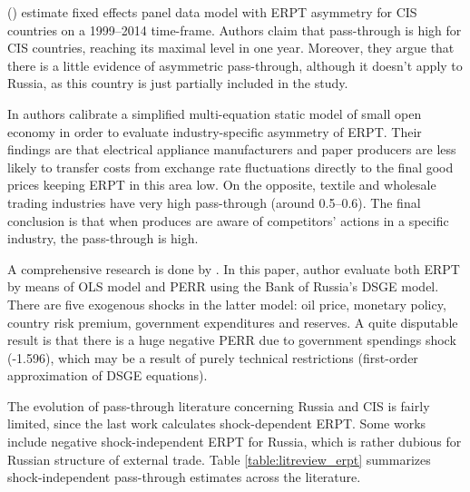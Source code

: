 \documentclass[12pt, a4paper]{extarticle}
\begin{document}
(\textcite{Comunale2018}) estimate fixed effects panel data model with ERPT asymmetry for CIS countries on a 1999--2014 time-frame. Authors claim that pass-through is high for CIS countries, reaching its maximal level in one year. Moreover, they argue that there is a little evidence of asymmetric pass-through, although it doesn't apply to Russia, as this country is just partially included in the study.

In \cite{Sinyakov2019} authors calibrate a simplified multi-equation static model of small open economy in order to evaluate industry-specific asymmetry of ERPT. Their findings are that electrical appliance manufacturers and paper producers are less likely to transfer costs from exchange rate fluctuations directly to the final good prices keeping ERPT in this area low. On the opposite, textile and wholesale trading industries have very high pass-through (around 0.5--0.6). The final conclusion is that when produces are aware of competitors' actions in a specific industry, the pass-through is high.

A comprehensive research is done by \textcite{Khotulev2020}. In this paper, author evaluate both ERPT by means of OLS model and PERR using the Bank of Russia's DSGE model. There are five exogenous shocks in the latter model: oil price, monetary policy, country risk premium, government expenditures and reserves. A quite disputable result is that there is a huge negative PERR due to government spendings shock (-1.596), which may be a result of purely technical restrictions (first-order approximation of DSGE equations).

The evolution of pass-through literature concerning Russia and CIS is fairly limited, since the last work calculates shock-dependent ERPT. Some works include negative shock-independent ERPT for Russia, which is rather dubious for Russian structure of external trade. Table \ref{table:litreview_erpt} summarizes shock-independent pass-through estimates across the literature.
\end{document}

